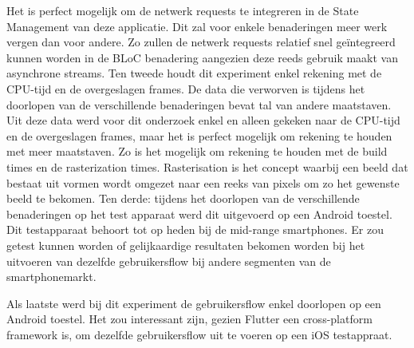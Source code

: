 Het is perfect mogelijk om de netwerk requests te integreren in de State Management van deze applicatie. Dit zal voor enkele benaderingen meer werk vergen dan voor andere. Zo zullen de netwerk requests relatief snel geïntegreerd kunnen worden in de BLoC benadering aangezien deze reeds gebruik maakt van asynchrone streams. \newline \newline
Ten tweede houdt dit experiment enkel rekening met de CPU-tijd en de overgeslagen frames. De data die verworven is   tijdens het doorlopen van de verschillende benaderingen bevat tal van andere maatstaven. Uit deze data werd voor dit onderzoek enkel en alleen gekeken naar de CPU-tijd en de overgeslagen frames, maar het is perfect mogelijk om rekening te houden met meer maatstaven. Zo is het mogelijk om rekening te houden met de build times en de rasterization times. Rasterisation is het concept waarbij een beeld dat bestaat uit vormen wordt omgezet naar een reeks van pixels om zo het gewenste beeld te bekomen. \newline \newline
Ten derde: tijdens het doorlopen van de verschillende benaderingen op het test apparaat werd dit uitgevoerd op een Android toestel. Dit testapparaat behoort tot op heden bij de mid-range smartphones. Er zou getest kunnen worden of gelijkaardige resultaten bekomen worden bij het uitvoeren van dezelfde gebruikersflow bij andere segmenten van de smartphonemarkt. 

Als laatste werd bij dit experiment de gebruikersflow enkel doorlopen op een Android toestel. Het zou interessant zijn, gezien Flutter een cross-platform framework is, om dezelfde gebruikersflow uit te voeren op een iOS testappraat. 

